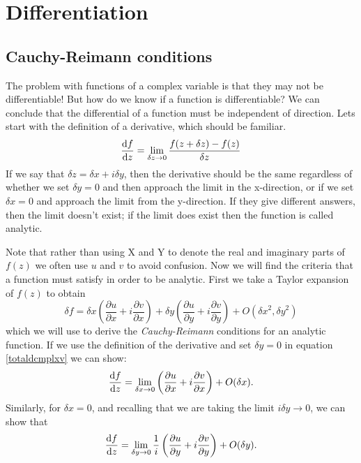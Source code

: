 \section{Differentiation}
\subsection{Cauchy-Reimann conditions}
The problem with functions of a complex variable is that they may not be differentiable!
 But how do we know if a function is differentiable? 
 We can conclude that the differential of a function must be independent of direction.
 Lets start with the definition of a derivative, which should be familiar.
%
\begin{equation*}
\frac{\mathop{}\!\mathrm{d} f}{\mathop{}\!\mathrm{d} z}=\lim_{\delta z\to 0}\frac{f(z+\delta z)-f(z)}{\delta z}
\end{equation*}
%
If we say that $\delta z=\delta x + i\delta y$, then the derivative should be the same regardless of whether we set $\delta y=0$ and then approach the limit in the x-direction, or if we set $\delta x=0$ and approach the limit from the y-direction.
 If they give different answers, then the limit doesn't exist; if the limit does exist then the function is called analytic.
\par 
Note that rather than using X and Y to denote the real and imaginary parts of $f(z)$ we often use $u$ and $v$ to avoid confusion.
 Now we will find the criteria that a function must satisfy in order to be analytic.
 First we take a Taylor expansion of $f(z)$ to obtain
 \begin{equation}
 \label{totaldcmplxv}
 \delta f=\delta x \left(\frac{\partial u}{\partial x} + i \frac{\partial v}{\partial x}\right) + \delta y \left(\frac{\partial u}{\partial y}+i\frac{\partial v}{\partial y}\right) + O\left({\delta x}^2,{\delta y}^2\right)
 \end{equation}
 which we will use to derive the \emph{Cauchy-Reimann} conditions for an analytic function.
 If we use the definition of the derivative and set $\delta y=0$ in equation \ref{totaldcmplxv} we can show:
%
\begin{equation*}
\frac{\mathop{}\!\mathrm{d} f}{\mathop{}\!\mathrm{d} z}=\lim_{\delta x\to 0}\left(\frac{\partial u}{\partial x} + i \frac{\partial v}{\partial x}\right) + O(\delta x).
\end{equation*}
%
Similarly, for $\delta x=0$, and recalling that we are taking the limit $i\delta y \rightarrow 0$, we can show that
%
\begin{equation*}
\frac{\mathop{}\!\mathrm{d} f}{\mathop{}\!\mathrm{d} z}=\lim_{\delta y\to 0}\frac{1}{i}\left(\frac{\partial u}{\partial y} + i \frac{\partial v}{\partial y}\right) + O(\delta y).
\end{equation*}
